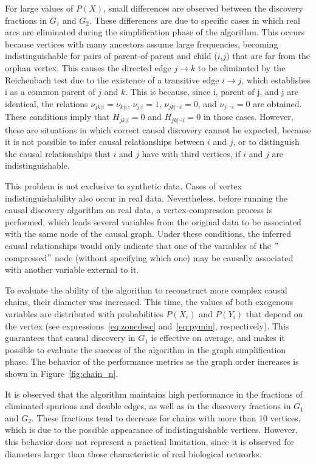 \documentclass[12pt,a4paper]{report}
\begin{document}
For large values of $P(X)$, small differences are observed between the discovery fractions in $G_1$ and $G_2$. These differences are due to specific cases in which real arcs are eliminated during the simplification phase of the algorithm. This occurs because vertices with many ancestors assume large frequencies, becoming indistinguishable for pairs of parent-of-parent and child ($i$,$j$) that are far from the orphan vertex. This causes the directed edge $j \to k$ to be eliminated by the Reichenbach test due to the existence of a transitive edge $i \to j$, which establishes i as a common parent of $j$ and $k$. This is because, since i, parent of j, and j are identical, the relations $\nu_{jk|i} = \nu_{k|i}$, $\nu_{j|i} = 1$, $\nu_{jk| \neg i} = 0$, and $\nu_{j| \neg i} = 0$ are obtained. These conditions imply that $H_{jk|i} = 0$ and $H_{jk| \neg i} = 0$ in those cases. However, these are situations in which correct causal discovery cannot be expected, because it is not possible to infer causal relationships between $i$ and $j$, or to distinguish the causal relationships that $i$ and $j$ have with third vertices, if $i$ and $j$ are indistinguishable.


This problem is not exclusive to synthetic data. Cases of vertex indistinguishability also occur in real data. Nevertheless, before running the causal discovery algorithm on real data, a vertex-compression process is performed, which leads several variables from the original data to be associated with the same node of the causal graph. Under these conditions, the inferred causal relationships would only indicate that one of the variables of the $"$compressed$"$ node (without specifying which one) may be causally associated with another variable external to it.


To evaluate the ability of the algorithm to reconstruct more complex causal chains, their diameter was increased. This time, the values of both exogenous variables are distributed with probabilities $P(X_i)$ and $P(Y_i)$ that depend on the vertex (see expressions~\ref{eq:zonedesc} and~\ref{eq:pymin}, respectively). This guarantees that causal discovery in $G_1$ is effective on average, and makes it possible to evaluate the success of the algorithm in the graph simplification phase. The behavior of the performance metrics as the graph order increases is shown in Figure~\ref{fig:chain_n}.

It is observed that the algorithm maintains high performance in the fractions of eliminated spurious and double edges, as well as in the discovery fractions in $G_1$ and $G_2$. These fractions tend to decrease for chains with more than 10 vertices, which is due to the possible appearance of indistinguishable vertices. However, this behavior does not represent a practical limitation, since it is observed for diameters larger than those characteristic of real biological networks\cite{borner}.
\end{document}
